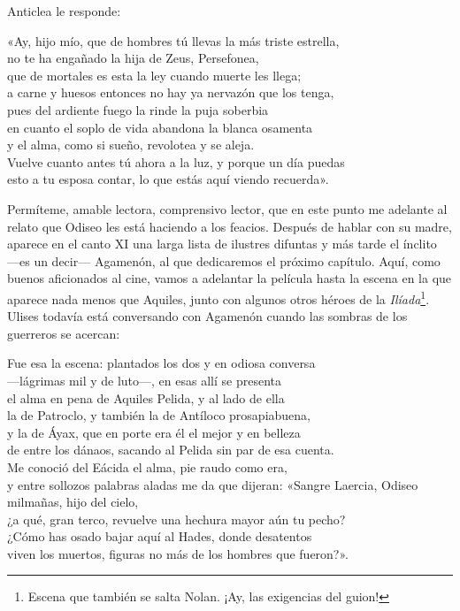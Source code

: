 Anticlea le responde:

\begin{versocita}
«Ay, hijo mío, que de hombres tú llevas la más triste estrella,\\
no te ha engañado la hija de Zeus, Persefonea,\\
que de mortales es esta la ley cuando muerte les llega;\\
a carne y huesos entonces no hay ya nervazón que los tenga,\\
pues del ardiente fuego la rinde la puja soberbia\\
en cuanto el soplo de vida abandona la blanca osamenta\\
y el alma, como si sueño, revolotea y se aleja.\\
Vuelve cuanto antes tú ahora a la luz, y porque un día puedas\\
esto a tu esposa contar, lo que estás aquí viendo recuerda».
\end{versocita}

Permíteme, amable lectora, comprensivo lector, que en este punto me adelante al relato que Odiseo les está haciendo a los feacios. Después de hablar con su madre, aparece en el canto XI una larga lista de ilustres difuntas y más tarde el ínclito ---es un decir--- Agamenón, al que dedicaremos el próximo capítulo. Aquí, como buenos aficionados al cine, vamos a adelantar la película hasta la escena en la que aparece nada menos que Aquiles, junto con algunos otros héroes de la \emph{Ilíada}\footnote{Escena que también se salta Nolan. ¡Ay, las exigencias del guion!}. Ulises todavía está conversando con Agamenón cuando las sombras de los guerreros se acercan:

\begin{versocita}
Fue esa la escena: plantados los dos y en odiosa conversa\\
---lágrimas mil y de luto---, en esas allí se presenta\\
el alma en pena de Aquiles Pelida, y al lado de ella\\
la de Patroclo, y también la de Antíloco prosapiabuena,\\
y la de Áyax, que en porte era él el mejor y en belleza\\
de entre los dánaos, sacando al Pelida sin par de esa cuenta.\\
Me conoció del Eácida el alma, pie raudo como era,\\
y entre sollozos palabras aladas me da que dijeran:
\stanzabreak
«Sangre Laercia, Odiseo milmañas, hijo del cielo,\\
¿a qué, gran terco, revuelve una hechura mayor aún tu pecho?\\
¿Cómo has osado bajar aquí al Hades, donde desatentos\\
viven los muertos, figuras no más de los hombres que fueron?».
\end{versocita}

